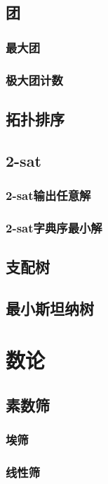 \documentclass[a4paper,twocolumn]{article}
\begin{document}
\subsection{团}
\subsubsection{最大团}

\subsubsection{极大团计数}

\subsection{拓扑排序}

\subsection{2-sat}
\subsubsection{2-sat输出任意解}

\subsubsection{2-sat字典序最小解}

\subsection{支配树}

\subsection{最小斯坦纳树}

\section{数论}
\subsection{素数筛}
\subsubsection{埃筛}

\subsubsection{线性筛}

\end{document}
